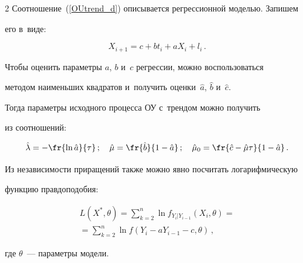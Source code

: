 \begin{multicols}{2}
        Соотношение~(\ref{OUtrend_d}) описывается регрессионной моделью. Запишем 


его в~виде:


        \begin{equation*} 




        X_{i+1} = c + b t_i + a X_{i} + l_i\,.


        \end{equation*}





        Чтобы оценить параметры $a$, $b$ и~$c$ регрессии, можно воспользоваться 


методом наименьших квад\-ра\-тов и~получить оценки~$\hat{a}$, $\hat{b}$ и~$\hat{c}.$ 


Тогда параметры исходного процесса ОУ с~трендом можно получить 


из соотношений:


        \begin{equation*}


                \hat{\lambda} = -\fr{\ln\hat{a}}{\tau}\,;\quad


                \hat{\mu} = \fr{\hat{b}}{1-\hat{a}}\,; \quad


                \hat{\mu}_0 = \fr{\hat{c} - \hat{\mu} \tau}{1 - \hat{a}}\,.


        \end{equation*}





        Из независимости приращений также можно явно посчитать логарифмическую 


функцию правдоподобия: 


\begin{multline*}


L\left(X^*, \theta\right) =  \sum\limits_{k = 2}^n \ln 


f_{Y_i |Y_{i -1}}(X_i , \theta) = {}\\


{}=  \sum\limits_{k = 2}^n \ln 


f\left(Y_i - a Y_{i - 1} - c,\theta\right)\,,


\end{multline*}


где $\theta$~--- параметры модели.






\end{multicols}
